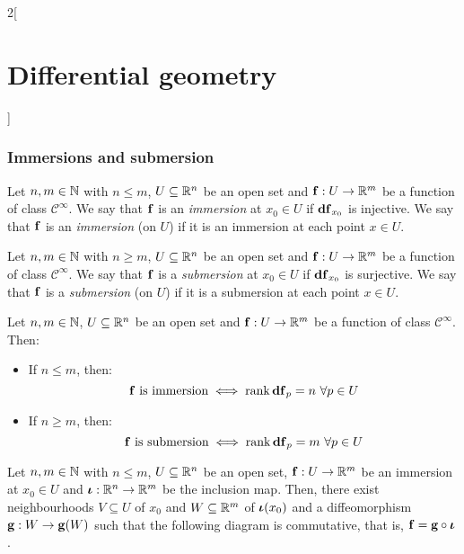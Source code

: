 \documentclass[../../../main.tex]{subfiles}
\begin{document}
\begin{multicols}{2}[\section{Differential geometry}]
  \subsubsection{Immersions and submersion}
  \begin{definition}[Immersion]
    Let $n,m\in\mathbb{N}$ with $n\leq m$, $U\subseteq\mathbb{R}^n$ be an open set and $\boldsymbol{\mathrm{f}}:U\rightarrow \mathbb{R}^m$ be a function of class $\mathcal{C}^\infty$. We say that $\boldsymbol{\mathrm{f}}$ is an \emph{immersion} at $x_0\in U$ if $\boldsymbol{\mathrm{\dd{f}}}_{x_0}$ is injective. We say that $\boldsymbol{\mathrm{f}}$ is an \emph{immersion} (on $U$) if it is an immersion at each point $x\in U$.
  \end{definition}
  \begin{definition}[Submersion]
    Let $n,m\in\mathbb{N}$ with $n\geq m$, $U\subseteq\mathbb{R}^n$ be an open set and $\boldsymbol{\mathrm{f}}:U\rightarrow \mathbb{R}^m$ be a function of class $\mathcal{C}^\infty$. We say that $\boldsymbol{\mathrm{f}}$ is a \emph{submersion} at $x_0\in U$ if $\boldsymbol{\mathrm{\dd{f}}}_{x_0}$ is surjective. We say that $\boldsymbol{\mathrm{f}}$ is a \emph{submersion} (on $U$) if it is a submersion at each point $x\in U$.
  \end{definition}
  \begin{proposition}
    Let $n,m\in\mathbb{N}$, $U\subseteq\mathbb{R}^n$ be an open set and $\boldsymbol{\mathrm{f}}:U\rightarrow \mathbb{R}^m$ be a function of class $\mathcal{C}^\infty$. Then:
    \begin{itemize}
      \item If $n\leq m$, then: $$\boldsymbol{\mathrm{f}}\text{ is immersion}\iff\rank\boldsymbol{\mathrm{df}}_p=n\ \forall p\in U$$
      \item If $n\geq m$, then: $$\boldsymbol{\mathrm{f}}\text{ is submersion}\iff\rank\boldsymbol{\mathrm{df}}_p=m\ \forall p\in U$$
    \end{itemize}
  \end{proposition}
  \begin{theorem}
    Let $n,m\in\mathbb{N}$ with $n\leq m$, $U\subseteq\mathbb{R}^n$ be an open set, $\boldsymbol{\mathrm{f}}:U\rightarrow \mathbb{R}^m$ be an immersion at $x_0\in U$ and $\boldsymbol{\mathrm{\iota}}:\mathbb{R}^n\rightarrow\mathbb{R}^m$ be the inclusion map. Then, there exist neighbourhoods $V\subseteq U$ of $x_0$ and $W\subseteq\mathbb{R}^m$ of $\boldsymbol{\mathrm{\iota}}(x_0)$ and a diffeomorphism $\boldsymbol{\mathrm{g}}:W\rightarrow \boldsymbol{\mathrm{g}}(W)$ such that the following diagram is commutative, that is, $\boldsymbol{\mathrm{f}}=\boldsymbol{\mathrm{g}}\circ\boldsymbol{\mathrm{\iota}}$.
    \begin{center}
      \begin{minipage}{\linewidth}
        \centering
        
      \end{minipage}

\end{center}
\end{theorem}
\end{multicols}
\end{document}
